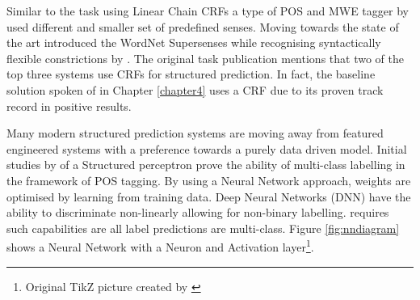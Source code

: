 Similar to the \dimsum task using Linear Chain CRFs a type of POS and MWE tagger by \cite{Constant2011} used different and smaller set of predefined senses. Moving towards the state of the art introduced the WordNet Supersenses while recognising syntactically flexible constrictions by \cite{Schneider2014}. The original \dimsum task publication mentions that two of the top three systems use CRFs for structured prediction. In fact, the baseline solution spoken of in Chapter \ref{chapter4} uses a CRF due to its proven track record in positive results. 

Many modern structured prediction systems are moving away from featured engineered systems with a preference towards a purely data driven model. Initial studies by \cite{collins2002discriminative} of a Structured perceptron prove the ability of multi-class labelling in the framework of POS tagging. By using a Neural Network approach, weights are optimised by learning from training data. Deep Neural Networks (DNN) have the ability to discriminate non-linearly allowing for non-binary labelling. \dimsum requires such capabilities are all label predictions are multi-class. Figure \ref{fig:nndiagram} shows a Neural Network with a Neuron and Activation layer\footnote{Original TikZ picture created by \cite{neuralnetdiagram}}.

